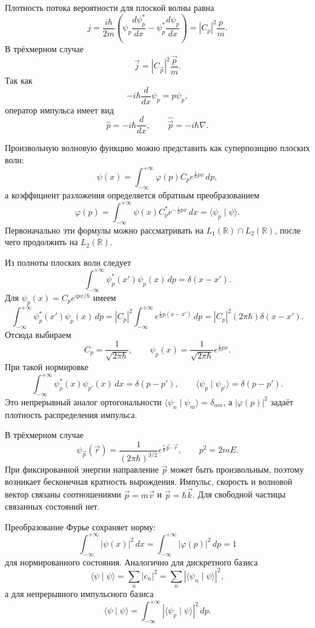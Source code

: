 \documentclass[12pt,a4paper]{article}
\begin{document}
Плотность потока вероятности для плоской волны равна
\[
    j=\frac{i\hbar}{2m}
    \left(\psi_p\frac{d\psi_p^*}{dx}-\psi_p^*\frac{d\psi_p}{dx}\right)
    =|C_p|^2\frac{p}{m}.
\]
В трёхмерном случае
\[
    \vec j=|C_{\vec p}|^2\frac{\vec p}{m}.
\]
Так как
\[
    -i\hbar\frac{d}{dx}\psi_p=p\psi_p,
\]
оператор импульса имеет вид
\[
    \boxed{\hat p=-i\hbar\frac{d}{dx}},
    \qquad
    \boxed{\hat{\vec p}=-i\hbar\nabla}.
\]

Произвольную волновую функцию можно представить как суперпозицию плоских
волн:
\[
    \psi(x)=\int_{-\infty}^{+\infty}\varphi(p)C_p
    e^{\frac{i}{\hbar}px}\,dp,
\]
а коэффициент разложения определяется обратным преобразованием
\[
    \varphi(p)=\int_{-\infty}^{+\infty}\psi(x)C_p^*
    e^{-\frac{i}{\hbar}px}\,dx
    =\langle\psi_p\mid\psi\rangle.
\]
Первоначально эти формулы можно рассматривать на
$L_1(\mathbb R)\cap L_2(\mathbb R)$, после чего продолжить на $L_2(\mathbb R)$.

Из полноты плоских волн следует
\[
    \int_{-\infty}^{+\infty}\psi_p^*(x')\psi_p(x)\,dp
    =\delta(x-x').
\]
Для $\psi_p(x)=C_p e^{ipx/\hbar}$ имеем
\[
    \int_{-\infty}^{+\infty}\psi_p^*(x')\psi_p(x)\,dp
    =|C_p|^2\int_{-\infty}^{+\infty}e^{\frac{i}{\hbar}p(x-x')}\,dp
    =|C_p|^2(2\pi\hbar)\delta(x-x').
\]
Отсюда выбираем
\[
    \boxed{C_p=\frac{1}{\sqrt{2\pi\hbar}}},
    \qquad
    \psi_p(x)=\frac{1}{\sqrt{2\pi\hbar}}e^{\frac{i}{\hbar}px}.
\]
При такой нормировке
\[
    \int_{-\infty}^{+\infty}\psi_p^*(x)\psi_{p'}(x)\,dx
    =\delta(p-p'),
    \qquad
    \langle\psi_p\mid\psi_{p'}\rangle=\delta(p-p').
\]
Это непрерывный аналог ортогональности
$\langle\psi_n\mid\psi_m\rangle=\delta_{nm}$, а $|\varphi(p)|^2$ задаёт
плотность распределения импульса.

В трёхмерном случае
\[
    \psi_{\vec p}(\vec r)
    =\frac{1}{(2\pi\hbar)^{3/2}}
    e^{\frac{i}{\hbar}\vec p\cdot\vec r},
    \qquad
    p^2=2mE.
\]
При фиксированной энергии направление $\vec p$ может быть произвольным,
поэтому возникает бесконечная кратность вырождения. Импульс, скорость и волновой вектор связаны соотношениями
$\vec p=m\vec v$ и $\vec p=\hbar\vec k$. Для свободной частицы
связанных состояний нет.

Преобразование Фурье сохраняет норму:
\[
    \int_{-\infty}^{+\infty}|\psi(x)|^2\,dx
    =\int_{-\infty}^{+\infty}|\varphi(p)|^2\,dp=1
\]
для нормированного состояния. Аналогично для дискретного базиса
\[
    \langle\psi\mid\psi\rangle
    =\sum_n|c_n|^2
    =\sum_n|\langle\psi_n\mid\psi\rangle|^2,
\]
а для непрерывного импульсного базиса
\[
    \langle\psi\mid\psi\rangle
    =\int_{-\infty}^{+\infty}|\langle\psi_p\mid\psi\rangle|^2\,dp.
\]
\end{document}
